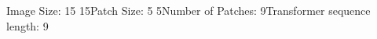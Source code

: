 \documentclass[preview]{standalone}
\begin{document}
\begin{center}
Image Size: 15 \times 15Patch Size: 5 \times 5Number of Patches: 9Transformer sequence length: 9
\end{center}
\end{document}
